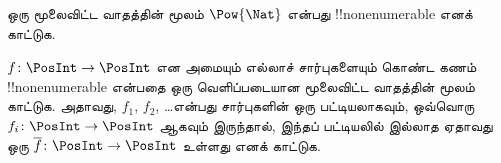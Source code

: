 \documentclass[../../../include/open-logic-section]{subfiles}
\begin{document}
\begin{prob}
ஒரு மூலைவிட்ட வாதத்தின் மூலம் $\Pow{\Nat}$ என்பது
!!{nonenumerable} எனக் காட்டுக.
\end{prob}

\begin{prob}\label{sfr:siz:nen:prob:f-posint}
$f \colon \PosInt \to \PosInt$ என அமையும் எல்லாச் சார்புகளையும்
கொண்ட கணம் !!{nonenumerable} என்பதை ஒரு வெளிப்படையான
மூலைவிட்ட வாதத்தின் மூலம் காட்டுக.
அதாவது, $f_1$, $f_2$, \dots என்பது சார்புகளின் ஒரு பட்டியலாகவும்,
ஒவ்வொரு $f_i\colon
\PosInt \to \PosInt$ ஆகவும் இருந்தால்,
இந்தப் பட்டியலில் இல்லாத ஏதாவது ஒரு
$\overline{f}\colon \PosInt \to
\PosInt$ உள்ளது எனக் காட்டுக.
\end{prob}
\end{document}
